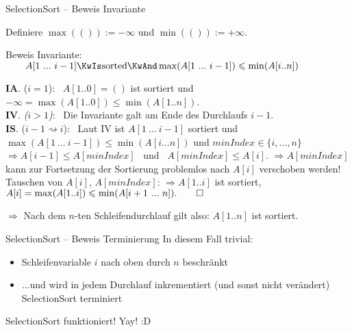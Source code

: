 \begin{frame}{SelectionSort -- Beweis Invariante}
	\begin{overlayarea}{\textwidth}{.60\textwidth}
		{Definiere \quad $\max(()) := -\infty$ \quad und \quad $\min(()) := +\infty$. \\} 
		
		Beweis Invariante: \\ 
		$\quad\quad \selsortinvariant$ 
		
		{\hanging\textbf{IA}. ($i=1$): \ $A[1..0] = ()$ ist sortiert und $-\infty = \max(A[1..0]) \leq \min(A[1..n])$. \\}
		{\hanging\textbf{IV}. \textit{($i > 1$)}: \ Die Invariante galt am Ende des Durchlaufs $i - 1$. \\}
		\hanging\textbf{IS}. ($i - 1 \rightsquigarrow i$): \ Laut IV ist $A[1\ ...\ i-1]$ sortiert und \newline
		$\max(A[1\ ...\ i-1]) \leq \min(A[i...n])$ \quad und \quad $minIndex \in \{i,...,n\}$ \newline
		$\Rightarrow A[i-1] \leq A[minIndex]$ \ und \ $A[minIndex] \leq A[i]$. \newline
		$\Rightarrow A[minIndex]$ kann zur Fortsetzung der Sortierung problemlos nach $A[i]$ verschoben werden! 
		Tauschen von $A[i]$, $A[minIndex]$: \newline
		$\Rightarrow A[1..i]$ ist sortiert, \newline
		$A[i] = \max(A[1..i]) \leq \min(A[i+1 \ ... \ n]). \qed$ \newline
		
		$\Rightarrow$ Nach dem $n$-ten Schleifendurchlauf gilt also: $A[1..n]$ ist sortiert.
	\end{overlayarea}
\end{frame}

\begin{frame}{SelectionSort -- Beweis Terminierung}
	In diesem Fall trivial: 
	\begin{itemize}
		\item Schleifenvariable $i$ nach oben durch $n$ beschränkt
		\item ...und wird in jedem Durchlauf inkrementiert (und sonst nicht verändert)
		\implitem SelectionSort terminiert
	\end{itemize}
	\impl SelectionSort funktioniert! Yay! :D
\end{frame}






